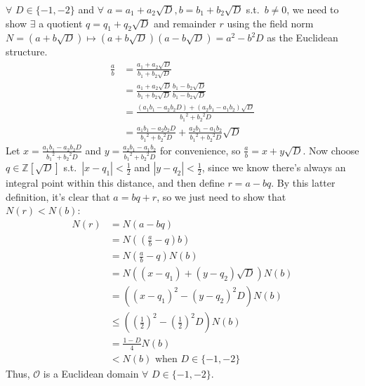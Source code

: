 \documentclass[fleqn]{article}
\begin{document}
        $\forall$ $D \in \{-1, -2\}$ and $\forall$ $a = a_1 + a_2 \sqrt{D}, b = b_1 + b_2 \sqrt{D}$ s.t.\ $b \neq 0$, we need to show $\exists$ a quotient $q = q_1 + q_2 \sqrt{D}$ and remainder $r$ using the field norm $N = \left(a + b\sqrt{D}\right) \mapsto \left(a + b\sqrt{D}\right)\left(a - b\sqrt{D}\right) = a^2 - b^2 D$ as the Euclidean structure.
        \begin{align}
            \frac{a}{b} &= \frac{a_1 + a_2 \sqrt{D}}{b_1 + b_2 \sqrt{D}} \\
                &= \frac{a_1 + a_2 \sqrt{D}}{b_1 + b_2 \sqrt{D}} \frac{b_1 - b_2 \sqrt{D}}{b_1 - b_2 \sqrt{D}} \\
                &= \frac{(a_1 b_1 - a_2 b_2 D) + (a_2 b_1 - a_1 b_2)\sqrt{D}}{{b_1}^2 + {b_2}^2 D} \\
                &= \frac{a_1 b_1 - a_2 b_2 D}{{b_1}^2 + {b_2}^2 D} + \frac{a_2 b_1 - a_1 b_2}{{b_1}^2 + {b_2}^2 D} \sqrt{D}
        \end{align}
        Let $x = \frac{a_1 b_1 - a_2 b_2 D}{{b_1}^2 + {b_2}^2 D}$ and $y = \frac{a_2 b_1 - a_1 b_2}{{b_1}^2 + {b_2}^2 D}$ for convenience, so $\frac{a}{b} = x + y\sqrt{D}$.  Now choose $q \in \mathbb{Z}\left[\sqrt{D}\right]$ s.t.\ $|x - q_1| < \frac{1}{2}$ and $|y - q_2| < \frac{1}{2}$, since we know there's always an integral point within this distance, and then define $r = a - bq$.  By this latter definition, it's clear that $a = bq + r$, so we just need to show that $N(r) < N(b)$:
        \begin{align}
            N(r) &= N(a - bq) \\
                &= N\left(\left(\frac{a}{b} - q\right) b\right) \\
                &= N\left(\frac{a}{b} - q\right) N(b) \\
                &= N\left((x - q_1) + (y - q_2) \sqrt{D}\right) N(b) \\
                &= \left((x - q_1)^2 - (y - q_2)^2 D\right) N(b) \\
                &\leq \left(\left(\frac{1}{2}\right)^2 - \left(\frac{1}{2}\right)^2 D\right) N(b) \\
                &= \frac{1 - D}{4} N(b) \\
                &< N(b) \text{ when } D \in \{-1, -2\}
        \end{align}
        Thus, $\mathcal{O}$ is a Euclidean domain $\forall$ $D \in \{-1, -2\}$.
        
\end{document}
